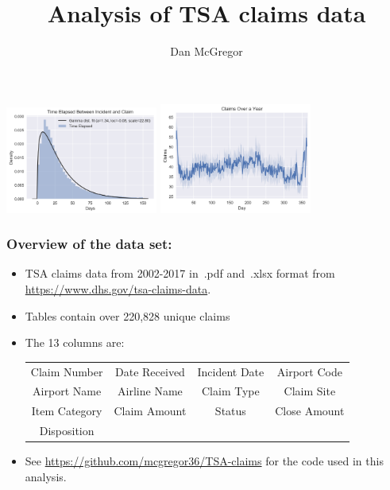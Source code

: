 \documentclass{beamer}
\title{Analysis of TSA claims data}
\author{Dan McGregor}
\date{}
\begin{document}
\begin{frame}
	\titlepage{}
	\includegraphics[keepaspectratio, width = 5cm]{../plots/wait_time}
	\hspace{1cm}
	\includegraphics[keepaspectratio, width = 5cm]{../plots/avg_year_day}
\end{frame}

\begin{frame}
	\frametitle{Overview of the data set:}
	\begin{itemize}
		\item TSA claims data from 2002-2017  in~.pdf and~.xlsx format from \url{https://www.dhs.gov/tsa-claims-data}.

		\item Tables contain over 220,828 unique claims

		\item The 13 columns are:
			\begin{tabular}{c c c c}
				Claim Number & Date Received & Incident Date & Airport Code\\
				Airport Name & Airline Name & Claim Type & Claim Site\\
				Item Category & Claim Amount & Status & Close Amount\\
				Disposition
			\end{tabular}

		\item See \url{https://github.com/mcgregor36/TSA-claims} for the code used in this analysis.
	\end{itemize}
\end{frame}
\end{document}
